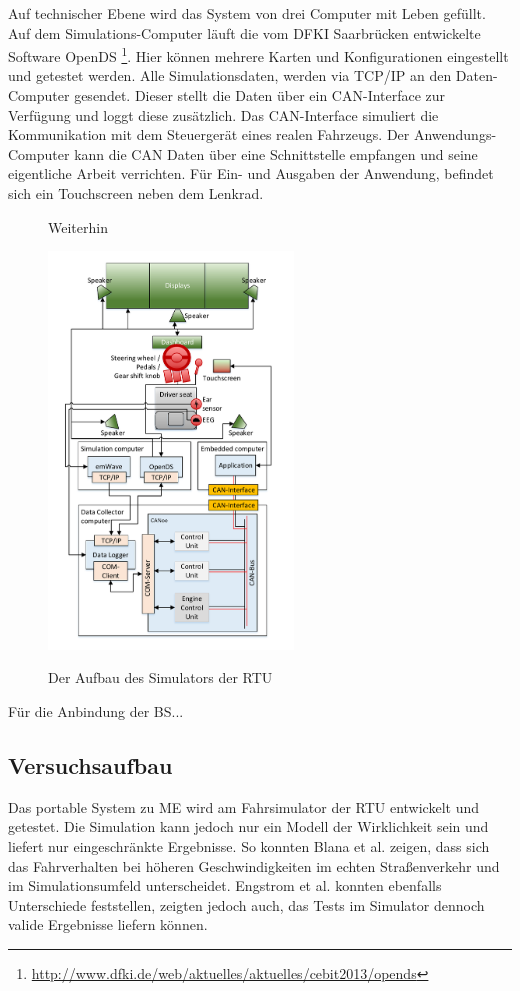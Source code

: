 {Auf technischer Ebene wird das System von drei Computer mit Leben gefüllt. Auf dem Simulations-Computer läuft die vom DFKI Saarbrücken entwickelte Software OpenDS \footnote{\url{http://www.dfki.de/web/aktuelles/aktuelles/cebit2013/opends}}. Hier können mehrere Karten und Konfigurationen eingestellt und getestet werden. Alle Simulationsdaten, werden via TCP/IP an den Daten-Computer gesendet. Dieser stellt die Daten über ein CAN-Interface zur Verfügung und loggt diese zusätzlich. Das CAN-Interface simuliert die Kommunikation mit dem Steuergerät eines realen Fahrzeugs. Der Anwendungs-Computer kann die CAN Daten über eine Schnittstelle empfangen und seine eigentliche Arbeit verrichten. Für Ein- und Ausgaben der Anwendung, befindet sich ein Touchscreen neben dem Lenkrad.
\begin{figure}[h]Weiterhin 
  \begin{center}
    \includegraphics[width=6.5cm]{img/architecture}
    \label{fig:architecure}
    \caption[Aufbau des Simulators]{Der Aufbau des Simulators der \acl{RTU}}
  \end{center}
\end{figure}

Für die Anbindung der \acl{BS}...


\subsection{Versuchsaufbau}
Das portable System zu \acl{ME} wird am Fahrsimulator der \acl{RTU} entwickelt und getestet.
Die Simulation kann jedoch nur ein Modell der Wirklichkeit sein und liefert nur eingeschränkte Ergebnisse. So konnten Blana et al. \cite{Blana_1} zeigen, dass sich das Fahrverhalten bei höheren Geschwindigkeiten im echten Straßenverkehr und im Simulationsumfeld unterscheidet. Engstrom et al.  \cite{Engstrom_2322937} konnten ebenfalls Unterschiede feststellen, zeigten jedoch auch, das Tests im Simulator dennoch valide Ergebnisse liefern können. 

}
